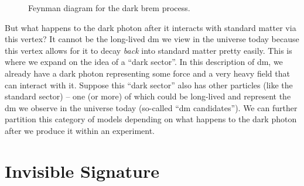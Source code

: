 \begin{figure}
	\centering
	\caption{
		Feynman diagram for the dark brem process.
	}
	\label{fig:dark-brem-feynman}
\end{figure}

But what happens to the dark photon after it interacts with standard matter via this vertex? It
cannot be the long-lived \ac{dm} we view in the universe today because this vertex allows for it
to decay \emph{back} into standard matter pretty easily. This is where we expand on the idea of a
``dark sector''. In this description of \ac{dm}, we already have a dark photon representing some
force and a very heavy field that can interact with it. Suppose this ``dark sector'' also has other
particles (like the standard sector) -- one (or more) of which could be long-lived and represent
the \ac{dm} we observe in the universe today (so-called ``\ac{dm} candidates''). We can further
partition this category of models depending on what happens to the dark photon after we
produce it within an experiment.

\section{Invisible Signature}
\label{sec:dm:invisible}

